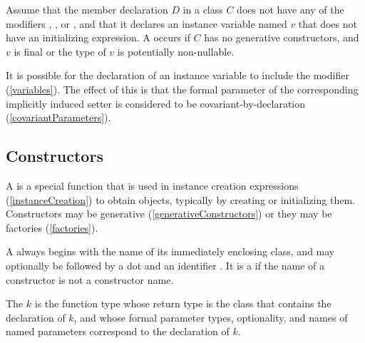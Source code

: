 \documentclass[makeidx]{article}
\begin{document}
\LMHash{}%
Assume that the member declaration $D$ in a class $C$
does not have any of the modifiers \LATE, \ABSTRACT, or \EXTERNAL,
and that it declares an instance variable named $v$
that does not have an initializing expression.
A  occurs if $C$ has no generative constructors,
and $v$ is final or the type of $v$ is potentially non-nullable.

\LMHash{}%
It is possible for the declaration of an instance variable
to include the modifier \COVARIANT{}
(\ref{variables}).
The effect of this is that the formal parameter of
the corresponding implicitly induced setter
is considered to be covariant-by-declaration
(\ref{covariantParameters}).



\subsection{Constructors}

\LMHash{}%
A  is a special function that is used
in instance creation expressions (\ref{instanceCreation}) to obtain objects,
typically by creating or initializing them.
Constructors may be generative (\ref{generativeConstructors})
or they may be factories (\ref{factories}).

\LMHash{}%
A  always begins with
the name of its immediately enclosing class,
and may optionally be followed by a dot and an identifier \id.
It is a  if the name of a constructor
is not a constructor name.

\LMHash{}%
The
$k$ is the function type
whose return type is the class that contains the declaration of $k$,
and whose formal parameter types, optionality, and names of named parameters
correspond to the declaration of $k$.
\end{document}

